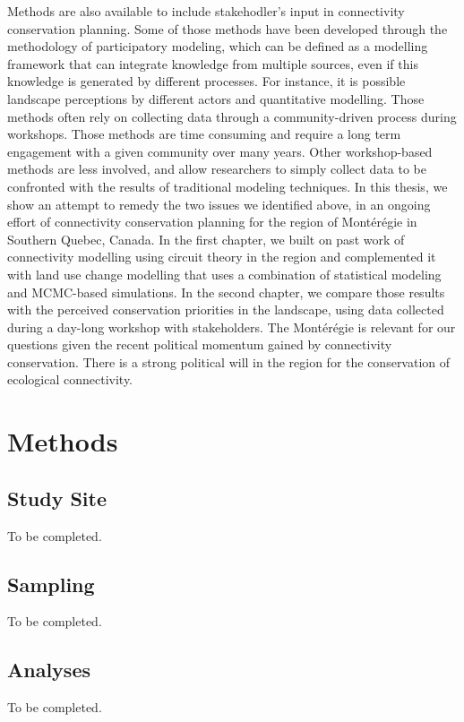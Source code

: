 Methods are also available to include stakehodler’s input in connectivity conservation planning. Some of those methods have been developed through the methodology of participatory modeling, which can be defined as a modelling framework that can integrate knowledge from multiple sources, even if this knowledge is generated by different processes. For instance, it is possible landscape perceptions by different actors and quantitative modelling. Those methods often rely on collecting data through a community-driven process during workshops. Those methods are time consuming and require a long term engagement with a given community over many years. Other workshop-based methods are less involved, and allow researchers to simply collect data to be confronted with the results of traditional modeling techniques.
In this thesis, we show an attempt to remedy the two issues we identified above,  in an ongoing effort of connectivity conservation planning for the region of Montérégie in Southern Quebec, Canada. In the first chapter, we built on past work of connectivity modelling using circuit theory in the region and complemented it with land use change modelling that uses a combination of statistical modeling and MCMC-based simulations. In the second chapter, we compare those results with the perceived conservation priorities in the landscape, using data collected during a day-long workshop with stakeholders. The Montérégie is relevant for our questions given the recent political momentum gained by connectivity conservation. There is a strong political will in the region for the conservation of ecological connectivity.
\\
\section{Methods}

\subsection*{Study Site}
To be completed.
\\
\subsection*{Sampling}
To be completed.
\\
\subsection*{Analyses}
To be completed.
\\
